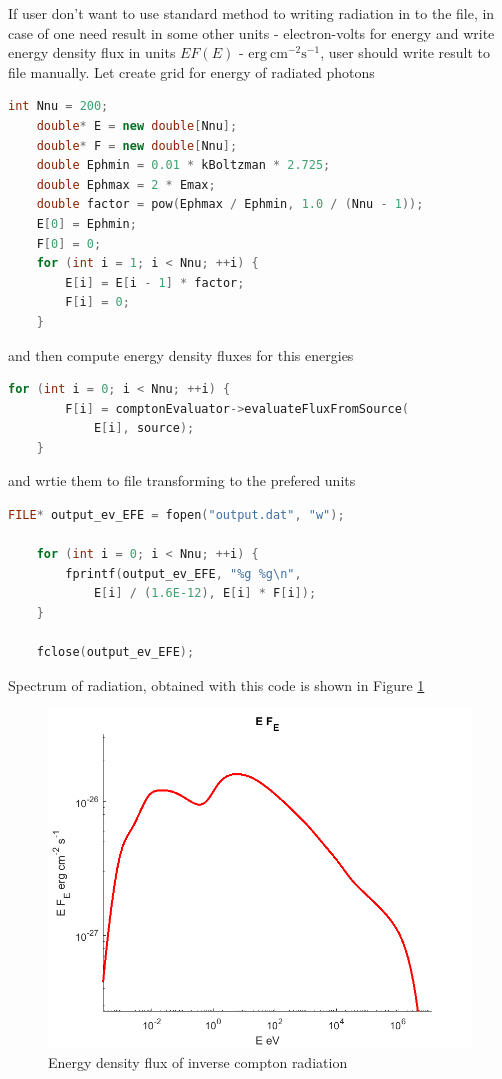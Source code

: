 If user don't want to use standard method to writing radiation in to the file, in case of one need result in some other units - electron-volts for energy and write energy density flux in units 
$E F(E)$ - $\text{erg}~\text{cm}^{-2}\text{s}^{-1}$, user should write result to file manually. Let create grid for energy of radiated photons
\begin{lstlisting}[language=c++]
	int Nnu = 200;
	double* E = new double[Nnu];
	double* F = new double[Nnu];
	double Ephmin = 0.01 * kBoltzman * 2.725;
	double Ephmax = 2 * Emax;
	double factor = pow(Ephmax / Ephmin, 1.0 / (Nnu - 1));
	E[0] = Ephmin;
	F[0] = 0;
	for (int i = 1; i < Nnu; ++i) {
		E[i] = E[i - 1] * factor;
		F[i] = 0;
	}
\end{lstlisting}
and then compute energy density fluxes for this energies
\begin{lstlisting}[language=c++]
	for (int i = 0; i < Nnu; ++i) {
		F[i] = comptonEvaluator->evaluateFluxFromSource(
		    E[i], source);
	}
\end{lstlisting}
and wrtie them to file transforming to the prefered units
\begin{lstlisting}[language=c++]
	FILE* output_ev_EFE = fopen("output.dat", "w");
	
	for (int i = 0; i < Nnu; ++i) {
		fprintf(output_ev_EFE, "%g %g\n",
		    E[i] / (1.6E-12), E[i] * F[i]);
	}

	fclose(output_ev_EFE);
\end{lstlisting}
Spectrum of radiation, obtained with this code is shown in Figure \ref{compton}
\begin{figure}[h]
	\centering
	\includegraphics[width=12.5 cm]{./fig/compton.png} 
	\caption{Energy density flux of inverse compton radiation}
	\label{compton}
\end{figure}


